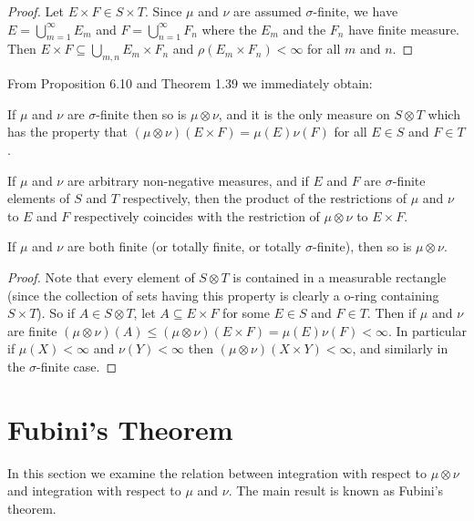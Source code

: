 \begin{proof}
Let $E\times F\in S\times T$. Since $\mu$ and $\nu$ are assumed $\sigma$-finite, we have $E=\bigcup_{m=1}^\infty E_m$ and $F=\bigcup_{n=1}^\infty F_n$ where the $E_m$ and the $F_n$ have finite measure. Then $E\times F\subseteq\bigcup_{m,n}E_m\times F_n$ and $\rho(E_m\times F_n)<\infty$ for all $m$ and $n$.
\end{proof}

From Proposition 6.10 and Theorem 1.39 we immediately obtain:

\begin{proposition}
If $\mu$ and $\nu$ are $\sigma$-finite then so is $\mu\otimes\nu$, and it is the only measure on $S\otimes T$ which has the property that $(\mu\otimes\nu)(E\times F)=\mu(E)\nu(F)$ for all $E\in S$ and $F\in T$.
\end{proposition}

\begin{corollary}
If $\mu$ and $\nu$ are arbitrary non-negative measures, and if $E$ and $F$ are $\sigma$-finite elements of $S$ and $T$ respectively, then the product of the restrictions of $\mu$ and $\nu$ to $E$ and $F$ respectively coincides with the restriction of $\mu\otimes\nu$ to $E\times F$.
\end{corollary} 

\begin{proposition}
If $\mu$ and $\nu$ are both finite (or totally finite, or totally $\sigma$-finite), then so is $\mu\otimes\nu$.
\end{proposition}

\begin{proof}
Note that every element of $S\otimes T$ is contained in a measurable rectangle (since the collection of sets having this property is clearly a o-ring containing $S\times T$). So if $A\in S\otimes T$, let $A\subseteq E\times F$ for some $E\in S$ and $F\in T$. Then if $\mu$ and $\nu$ are finite $(\mu\otimes\nu)(A)\leq(\mu\otimes\nu)(E\times F)=\mu(E)\nu(F)<\infty$. In particular if $\mu(X)<\infty$ and $\nu(Y)<\infty$ then $(\mu\otimes\nu)(X\times Y)<\infty$, and similarly in the $\sigma$-finite case.
\end{proof}

\section{Fubini's Theorem}

In this section we examine the relation between integration with respect to $\mu\otimes\nu$ and integration with respect to $\mu$ and $\nu$. The main result is known as Fubini's theorem.

